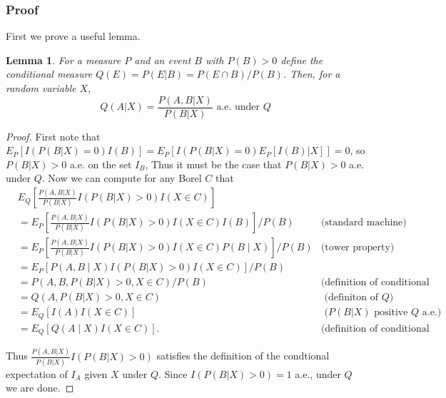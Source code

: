 \documentclass{article}
\newtheorem{lemma}{Lemma}
\begin{document}
\begin{appendix}
\subsubsection{Proof}

\fi 

First we prove a useful lemma. 

\begin{lemma}
    \label{lem:ce}
    For a measure $P$ and an event $B$ with $P(B)> 0$ define the conditional measure $Q(E) = P(E| B) = P(E \cap B)/P(B)$. Then, for a random variable $X$, 
    \begin{equation*}
        Q(A | X) = \frac{P(A, B | X) }{ P(B | X) } \text{ a.e. under } Q
    \end{equation*} 
\end{lemma}

\begin{proof}

    First note that $E_P[I( P(B| X) = 0 )  I(B)] = E_P[I( P(B| X) = 0 )  E_P[ I(B) | X] ] = 0$, so $P(B | X) > 0$ a.e. on the set $I_B$, Thus it must be the case that $P(B | X) > 0 $ a.e. under $Q$. Now we can compute for any Borel $C$ that  
    \begin{align*}
    &E_Q\left[\frac{P(A, B | X) }{ P(B | X) } I(P(B|X) > 0) I(X \in C) \right] \\
    &= E_P\left[\frac{P(A, B | X) }{ P(B | X) } I(P(B| X) > 0) I(X \in C) I(B)\right] / P(B)  & \text{(standard machine)}\\
    &= E_P\left[\frac{P(A, B | X) }{ P(B | X) } I(P(B| X) > 0) I(X \in C) P(B \mid X)\right] / P(B) & \text{(tower property)}  \\
    &= E_P[P(A, B \mid X) I(P(B|X) > 0) I(X \in C)] / P(B) & \\
    &= P(A, B, P(B|X) > 0, X \in C) / P(B) & \text{(definition of conditional expectation)}\\
    &= Q(A, P(B|X) > 0, X \in C) & \text{ (definiton of $Q$)}\\
    &= E_Q[I(A) I(X \in C)] & \text{ ($P(B|X)$ positive $Q$ a.e.)}\\ 
    &= E_Q[Q(A \mid X) I(X \in C)]. & \text{(definition of conditional expectation)}
    \end{align*}

    Thus $\frac{P(A, B | X) }{ P(B | X) } I(P(B|X) > 0)$ satisfies the definition of the condtional expectation of $I_A$ given $X$ under $Q$. Since $I(P(B|X) > 0) = 1$ a.e., under $Q$ we are done.  

\end{proof}


\end{appendix}
\end{document}
